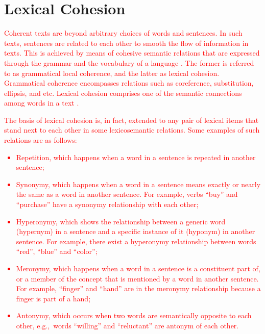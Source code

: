 \section{Lexical Cohesion}
\label{sec:lex-graph-motivation}
\textcolor{red}{
Coherent texts are beyond arbitrary choices of words and sentences.  
In such texts, sentences are related to each other to smooth the flow of information in texts. 
This is achieved by means of cohesive semantic relations that are expressed through the grammar and the vocabulary of a language \cite{halliday76}. 
The former is referred to as grammatical local coherence, and the latter as lexical cohesion.  
Grammatical coherence encompasses relations such as coreference, substitution, ellipsis, and etc. 
Lexical cohesion comprises one of the semantic connections among words in a text \cite{hoey91}. 

The basis of lexical cohesion is, in fact, extended to any pair of lexical items that stand next to each other in some lexicosemantic relations. 
Some examples of such relations are as follows: 

\begin{itemize}

\item Repetition, which happens when a word in a sentence is repeated in another sentence; 


\item Synonymy, which happens when a word in a sentence means exactly or nearly the same as a word in another sentence. 
For example, verbs ``buy'' and ``purchase'' have a synonymy relationship with each other;  

\item Hyperonymy, which shows the relationship between a generic word (hypernym) in a sentence and a specific instance of it (hyponym) in another sentence. 
For example, there exist a hyperonymy relationship between words ``red'', ``blue'' and ``color'';

\item Meronymy, which happens when a word in a sentence is a constituent part of, or a member of the concept that is mentioned by a word in another sentence. 
For example, ``finger'' and ``hand'' are in the meronymy relationship because a finger is part of a hand;

\item Antonymy, which occurs when two words are semantically opposite to each other, e.g.,\ words ``willing'' and  ``reluctant'' are antonym of each other. 


\end{itemize}}
